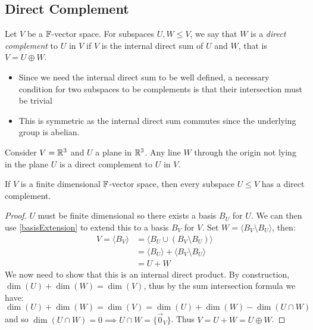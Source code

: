\documentclass[../main.tex]{subfiles}
\begin{document}
\subsection{Direct Complement}
\begin{definition}
  Let $V$ be a $\mathbb{F}$-vector space.
  For subspaces $U, W \leq V$, we say that $W$ is a \textit{direct complement} to $U$ in $V$ if $V$ is the internal direct sum of $U$ and $W$, that is $V = U \oplus W$.
\end{definition}
\begin{remark}[Remarks]
  \begin{itemize}
    \item Since we need the internal direct sum to be well defined, a necessary condition for two subspaces to be complements is that their intersection must be trivial
    \item This is symmetric as the internal direct sum commutes since the underlying group is abelian.
  \end{itemize}
\end{remark}
\begin{example}
  Consider $V = \mathbb{R}^3$ and $U$ a plane in $\mathbb{R}^3$.
  Any line $W$ through the origin not lying in the plane $U$ is a direct complement to $U$ in $V$.
\end{example}
\begin{proposition}
  If $V$ is a finite dimensional $\mathbb{F}$-vector space, then every subspace $U \leq V$ has a direct complement.
\end{proposition}
\begin{proof}
  $U$ must be finite dimensional so there exists a basis $B_U$ for $U$.
  We can then use \cref{basisExtension} to extend this to a basis $B_V$ for $V$.
  Set $W = \langle B_V \setminus B_U \rangle$, then:
  \begin{align*}
    V = \langle B_V \rangle &= \langle B_U \cup (B_V \setminus B_U) \rangle \\
                            &= \langle B_U \rangle + \langle B_V \setminus B_U \rangle \\
                            &= U + W
  \end{align*}
  We now need to show that this is an internal direct product.
  By construction, $\dim(U) + \dim(W) = \dim(V)$, thus by the sum intersection formula we have:
  \[
    \dim(U) + \dim(W) = \dim(V) = \dim(U) + \dim(W) - \dim(U \cap W)
  \]
  and so $\dim(U \cap W) = 0 \implies U \cap W = \{\vec{0}_V\}$.
  Thus $V = U + W = U \oplus W$.
\end{proof}
\end{document}
